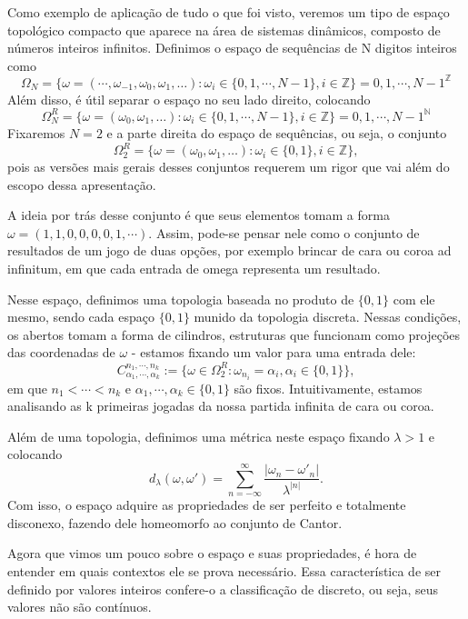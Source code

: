\documentclass{article}
\begin{document}
Como exemplo de aplica\c c\~ao de tudo o que foi visto, veremos um tipo de espa\c co topol\'ogico
compacto que aparece na \'area de sistemas din\^amicos, composto de n\'umeros inteiros infinitos.
Definimos o espa\c co de sequ\^encias de N digitos inteiros como 
$$
    \Omega_N = \{\omega = (\cdots, \omega_{-1}, \omega_0, \omega_1, \dots): \omega_i\in\{0, 1, \cdots, N-1\}, i\in\mathbb{Z}\}
    = {0, 1, \cdots, N-1}^{\mathbb{Z}}
$$
Al\'em disso, \'e \'util separar o espa\c co no seu lado direito, colocando
$$
    \Omega_N^R = \{\omega = (\omega_0, \omega_1, \dots): \omega_i\in\{0, 1, \cdots, N-1\}, i\in\mathbb{Z}\}
    = {0, 1, \cdots, N-1}^{\mathbb{N}}
$$
Fixaremos $N = 2$ e a parte direita do espa\c co de sequ\^encias, ou seja, o conjunto
$$
    \Omega_2^R = \{\omega = (\omega_0, \omega_1, \dots): \omega_i\in\{0, 1\}, i\in\mathbb{Z}\},
$$
pois as vers\~oes mais gerais desses conjuntos requerem um rigor que vai al\'em do escopo dessa apresenta\c c\~ao.

A ideia por tr\'as desse conjunto \'e que seus elementos tomam a forma $\omega = (1, 1, 0, 0, 0, 0, 1, \cdots)$.
Assim, pode-se pensar nele como o conjunto de resultados de um jogo de duas op\c c\~oes, por exemplo
brincar de cara ou coroa ad infinitum, em que cada entrada de omega representa um resultado.

Nesse espa\c co, definimos uma topologia baseada no produto de $\{0, 1\}$ com ele mesmo, sendo cada
espa\c co $\{0, 1\}$ munido da topologia discreta. Nessas condi\c c\~oes, os abertos tomam a forma
de cilindros, estruturas que funcionam como proje\c c\~oes das coordenadas de $\omega$ - estamos
fixando um valor para uma entrada dele:
$$
    C_{\alpha_1, \cdots, \alpha_k}^{n_1, \cdots, n_k} := \{\omega\in\Omega_2^R: \omega_{n_i} = \alpha_i, 
\alpha_i\in\{0, 1\}\},
$$
em que $n_1 < \cdots < n_k$ e $\alpha_1, \cdots, \alpha_k\in\{0, 1\}$ s\~ao fixos. Intuitivamente,
estamos analisando as k primeiras jogadas da nossa partida infinita de cara ou coroa.

Al\'em de uma topologia, definimos uma m\'etrica neste espa\c co fixando $\lambda > 1$ e colocando
$$
    d_\lambda(\omega, \omega') = \sum_{n=-\infty}^{\infty}\frac{|\omega_n - \omega'_n|}{\lambda^{|n|}}.
$$
Com isso, o espa\c co adquire as propriedades de ser perfeito e totalmente disconexo, fazendo dele
homeomorfo ao conjunto de Cantor. 

Agora que vimos um pouco sobre o espa\c co e suas propriedades, \'e hora de entender em quais contextos
ele se prova necess\'ario. Essa caracter\'istica de ser definido por valores inteiros confere-o
a classifica\c c\~ao de discreto, ou seja, seus valores n\~ao s\~ao cont\'inuos. 
\end{document}
